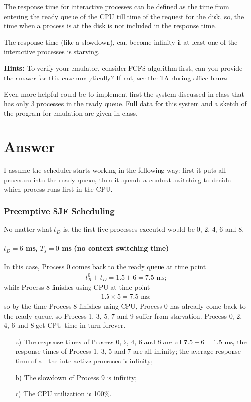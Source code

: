 \documentclass[12pt,letterpaper]{article}
\begin{document}
The response time for interactive processes can be defined as the time from
entering the ready queue of the CPU till time of the request for the disk, so, the time
when a process is at the disk is not included in the response time.

The response time (like a slowdown), can become infinity if at least one of the
interactive processes is starving.

{\bf Hints:} To verify your emulator, consider FCFS algorithm first, can you provide
the answer for this case analytically? If not, see the TA during office hours.

Even more helpful could be to implement first the system discussed in class that
has only 3 processes in the ready queue. Full data for this system and a sketch of the
program for emulation are given in class.

\part*{Answer}
I assume the scheduler starts working in the following way: first it puts all processes into the ready queue, then it spends a context switching to decide which process runs first in the CPU.

\section{Preemptive SJF Scheduling}
No matter what $t_D$ is, the first five processes executed would be 0, 2, 4, 6 and 8.

\subsection{$t_D=6$ ms, $T_s = 0$ ms (no context switching time)} 
In this case, Process 0 comes back to the ready queue at time point 
\begin{eqnarray}
t_B^0+t_D=1.5+6=7.5\textrm{ ms};
\end{eqnarray}
while Process 8 finishes using CPU at time point 
\begin{eqnarray}
1.5\times5=7.5\textrm{ ms};
\end{eqnarray}
so by the time Process 8 finishes using CPU, Process 0 has already come back to the ready queue, so Process 1, 3, 5, 7 and 9 suffer from starvation. Process 0, 2, 4, 6 and 8 get CPU time in turn forever.
\begin{enumerate}
\item[a)] The response times of Process 0, 2, 4, 6 and 8 are all $7.5-6=1.5$ ms; the response times of Process 1, 3, 5 and 7 are all infinity; the average response time of all the interactive processes is infinity;
\item[b)] The slowdown of Process 9 is infinity;
\item[c)] The CPU utilization is 100\%.
\end{enumerate}
\end{document}
